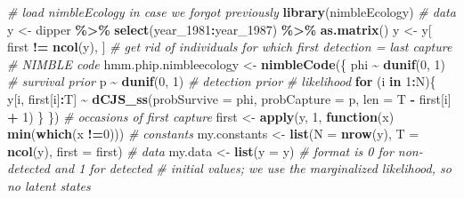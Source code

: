 \documentclass[
  12pt,
]{krantz}
\newenvironment{Shaded}{\begin{snugshade}}{\end{snugshade}}
\newcommand{\AttributeTok}[1]{\textcolor[rgb]{0.13,0.29,0.53}{#1}}
\newcommand{\CommentTok}[1]{\textcolor[rgb]{0.56,0.35,0.01}{\textit{#1}}}
\newcommand{\ControlFlowTok}[1]{\textcolor[rgb]{0.13,0.29,0.53}{\textbf{#1}}}
\newcommand{\DecValTok}[1]{\textcolor[rgb]{0.00,0.00,0.81}{#1}}
\newcommand{\FunctionTok}[1]{\textcolor[rgb]{0.13,0.29,0.53}{\textbf{#1}}}
\newcommand{\NormalTok}[1]{#1}
\newcommand{\OtherTok}[1]{\textcolor[rgb]{0.56,0.35,0.01}{#1}}
\newcommand{\SpecialCharTok}[1]{\textcolor[rgb]{0.81,0.36,0.00}{\textbf{#1}}}
\begin{document}
\begin{Shaded}
\begin{Highlighting}[]
\CommentTok{\# load nimbleEcology in case we forgot previously}
\FunctionTok{library}\NormalTok{(nimbleEcology)}
\CommentTok{\# data}
\NormalTok{y }\OtherTok{\textless{}{-}}\NormalTok{ dipper }\SpecialCharTok{\%\textgreater{}\%}
  \FunctionTok{select}\NormalTok{(year\_1981}\SpecialCharTok{:}\NormalTok{year\_1987) }\SpecialCharTok{\%\textgreater{}\%}
  \FunctionTok{as.matrix}\NormalTok{()}
\NormalTok{y }\OtherTok{\textless{}{-}}\NormalTok{ y[ first }\SpecialCharTok{!=} \FunctionTok{ncol}\NormalTok{(y), ] }\CommentTok{\# get rid of individuals for which first detection = last capture}
\CommentTok{\# NIMBLE code}
\NormalTok{hmm.phip.nimbleecology }\OtherTok{\textless{}{-}} \FunctionTok{nimbleCode}\NormalTok{(\{}
\NormalTok{  phi }\SpecialCharTok{\textasciitilde{}} \FunctionTok{dunif}\NormalTok{(}\DecValTok{0}\NormalTok{, }\DecValTok{1}\NormalTok{) }\CommentTok{\# survival prior}
\NormalTok{  p }\SpecialCharTok{\textasciitilde{}} \FunctionTok{dunif}\NormalTok{(}\DecValTok{0}\NormalTok{, }\DecValTok{1}\NormalTok{)   }\CommentTok{\# detection prior}
  \CommentTok{\# likelihood}
  \ControlFlowTok{for}\NormalTok{ (i }\ControlFlowTok{in} \DecValTok{1}\SpecialCharTok{:}\NormalTok{N)\{}
\NormalTok{    y[i, first[i]}\SpecialCharTok{:}\NormalTok{T] }\SpecialCharTok{\textasciitilde{}} \FunctionTok{dCJS\_ss}\NormalTok{(}\AttributeTok{probSurvive =}\NormalTok{ phi, }
                               \AttributeTok{probCapture =}\NormalTok{ p, }
                               \AttributeTok{len =}\NormalTok{ T }\SpecialCharTok{{-}}\NormalTok{ first[i] }\SpecialCharTok{+} \DecValTok{1}\NormalTok{)}
\NormalTok{  \}}
\NormalTok{\})}
\CommentTok{\# occasions of first capture}
\NormalTok{first }\OtherTok{\textless{}{-}} \FunctionTok{apply}\NormalTok{(y, }\DecValTok{1}\NormalTok{, }\ControlFlowTok{function}\NormalTok{(x) }\FunctionTok{min}\NormalTok{(}\FunctionTok{which}\NormalTok{(x }\SpecialCharTok{!=}\DecValTok{0}\NormalTok{)))}
\CommentTok{\# constants}
\NormalTok{my.constants }\OtherTok{\textless{}{-}} \FunctionTok{list}\NormalTok{(}\AttributeTok{N =} \FunctionTok{nrow}\NormalTok{(y), }
                     \AttributeTok{T =} \FunctionTok{ncol}\NormalTok{(y), }
                     \AttributeTok{first =}\NormalTok{ first)}
\CommentTok{\# data}
\NormalTok{my.data }\OtherTok{\textless{}{-}} \FunctionTok{list}\NormalTok{(}\AttributeTok{y =}\NormalTok{ y) }\CommentTok{\# format is 0 for non{-}detected and 1 for detected}
\CommentTok{\# initial values; we use the marginalized likelihood, so no latent states }

\end{Highlighting}
\end{Shaded}
\end{document}
